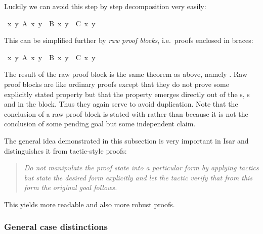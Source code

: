 \begin{isabellebody}
\begin{isamarkuptext}
Luckily we can avoid this step by step decomposition very easily:%
\end{isamarkuptext}%
\isamarkuptrue%
\ {\isachardoublequote}{\isasymforall}x\ y{\isachardot}\ A\ x\ y\ {\isasymand}\ B\ x\ y\ {\isasymlongrightarrow}\ C\ x\ y{\isachardoublequote}\isanewline
\isamarkupfalse%
\isamarkupfalse%
\isamarkupfalse%
\isamarkupfalse%
\isamarkupfalse%
\isamarkupfalse%
\isamarkupfalse%
\isamarkupfalse%
\isamarkupfalse%
\isamarkupfalse%
\isamarkupfalse%
\isamarkupfalse%
%
\begin{isamarkuptext}%
\noindent
This can be simplified further by \emph{raw proof blocks}, i.e.\
proofs enclosed in braces:%
\end{isamarkuptext}%
\isamarkuptrue%
\ {\isachardoublequote}{\isasymforall}x\ y{\isachardot}\ A\ x\ y\ {\isasymand}\ B\ x\ y\ {\isasymlongrightarrow}\ C\ x\ y{\isachardoublequote}\isanewline
\isamarkupfalse%
\isamarkupfalse%
\isamarkupfalse%
\isamarkupfalse%
\isamarkupfalse%
\isamarkupfalse%
\isamarkupfalse%
\isamarkupfalse%
\isamarkupfalse%
\isamarkupfalse%
\isamarkupfalse%
%
\begin{isamarkuptext}%
\noindent The result of the raw proof block is the same theorem
as above, namely .  Raw
proof blocks are like ordinary proofs except that they do not prove
some explicitly stated property but that the property emerges directly
out of the \isakeyword{fixe}s, \isakeyword{assume}s and
 in the block. Thus they again serve to avoid
duplication. Note that the conclusion of a raw proof block is stated with
\isakeyword{have} rather than \isakeyword{show} because it is not the
conclusion of some pending goal but some independent claim.

The general idea demonstrated in this subsection is very
important in Isar and distinguishes it from tactic-style proofs:
\begin{quote}\em
Do not manipulate the proof state into a particular form by applying
tactics but state the desired form explicitly and let the tactic verify
that from this form the original goal follows.
\end{quote}
This yields more readable and also more robust proofs.

\subsubsection{General case distinctions}


\end{isamarkuptext}
\end{isabellebody}
